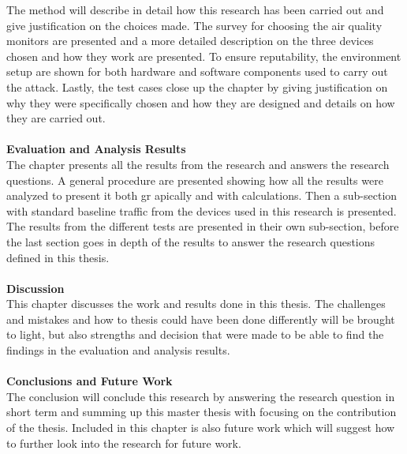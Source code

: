 The method will describe in detail how this research has been carried out and give justification on the choices made. The survey for choosing the air quality monitors are presented and a more detailed description on the three devices chosen and how they work are presented. To ensure reputability, the environment setup are shown for both hardware and software components used to carry out the attack. Lastly, the test cases close up the chapter by giving justification on why they were specifically chosen and how they are designed and details on how they are carried out. 
\\\\
\textbf{Evaluation and Analysis Results}
\\
The chapter presents all the results from the research and answers the research questions. A general procedure are presented showing how all the results were analyzed to present it both gr apically and with calculations. Then a sub-section with standard baseline traffic from the devices used in this research is presented. The results from the different tests are presented in their own sub-section, before the last section goes in depth of the results to answer the research questions defined in this thesis.  
\\\\
\textbf{Discussion}
\\
This chapter discusses the work and results done in this thesis. The challenges and mistakes and how to thesis could have been done differently will be brought to light, but also strengths and decision that were made to be able to find the findings in the evaluation and analysis results. 
\\\\
\textbf{Conclusions and Future Work}
\\
The conclusion will conclude this research by answering the research question in short term and summing up this master thesis with focusing on the contribution of the thesis. Included in this chapter is also future work which will suggest how to further look into the research for future work.